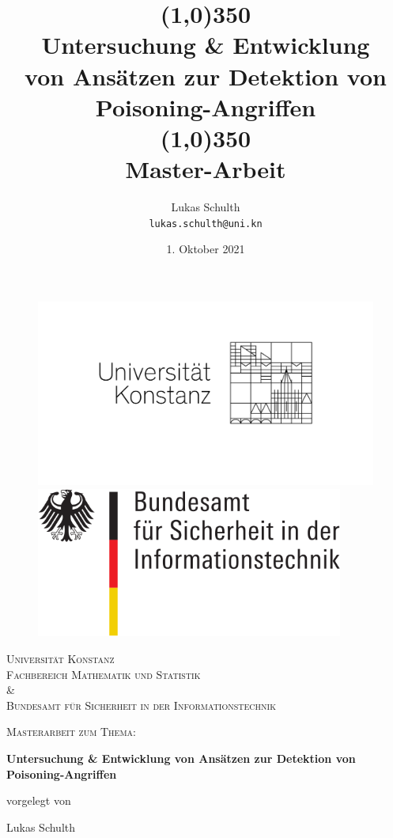 \documentclass[twoside, 12pt,a4paper]{book}
\title{\line(1,0){350}\\Untersuchung \& Entwicklung \\von Ansätzen zur Detektion von Poisoning-Angriffen\\\line(1,0){350}\\
	Master-Arbeit}
\author{
	Lukas Schulth\\
	\texttt{lukas.schulth@uni.kn}
}
\date{1. Oktober 2021}
\numberwithin{equation}{section}
\begin{document}
	
	\begin{titlepage}
		\thispagestyle{empty} 
		\begin{figure}
			\centering
			\begin{minipage}{0.45\textwidth}
				\centering
				\includegraphics[width=1.2\textwidth]{logounikn} %
				
			\end{minipage}\hfill
			\begin{minipage}{0.45\textwidth}
				\centering
				\includegraphics[width=0.9\textwidth]{bsi_logo} %
				
			\end{minipage}
		\end{figure}
		\centering
		\vspace{1cm}
		{\scshape\Large Universität Konstanz\\
			\large Fachbereich Mathematik und Statistik\\
			\& \\ \Large Bundesamt für Sicherheit in der Informationstechnik \par}
		\vspace{1cm}
		{\scshape\large Masterarbeit zum Thema:\par}
		\vspace{0.5cm}
		{\LARGE \bfseries Untersuchung \& Entwicklung von Ansätzen zur Detektion von Poisoning-Angriffen\par} %
		\vspace{0.5cm}
		\small vorgelegt von \par
		\vspace{0.5cm}
		{\large Lukas Schulth
			\par}
		

\end{titlepage}
\end{document}
